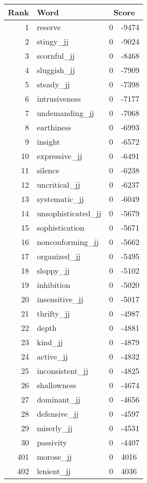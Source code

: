 \begin{longtable}[!htbp]{| rlr@{.}l |}
    \hline
    \textbf{Rank} & \textbf{Word} & \multicolumn{2}{c|}{\textbf{Score}} \\
    \hline
    \endhead
    1 & reserve & 0 & -9474 \\
    2 & stingy\_jj & 0 & -9024 \\
    3 & scornful\_jj & 0 & -8468 \\
    4 & sluggish\_jj & 0 & -7909 \\
    5 & steady\_jj & 0 & -7398 \\
    6 & intrusiveness & 0 & -7177 \\
    7 & undemanding\_jj & 0 & -7068 \\
    8 & earthiness & 0 & -6993 \\
    9 & insight & 0 & -6572 \\
    10 & expressive\_jj & 0 & -6491 \\
    11 & silence & 0 & -6238 \\
    12 & uncritical\_jj & 0 & -6237 \\
    13 & systematic\_jj & 0 & -6049 \\
    14 & unsophisticated\_jj & 0 & -5679 \\
    15 & sophistication & 0 & -5671 \\
    16 & nonconforming\_jj & 0 & -5662 \\
    17 & organized\_jj & 0 & -5495 \\
    18 & sloppy\_jj & 0 & -5102 \\
    19 & inhibition & 0 & -5020 \\
    20 & insensitive\_jj & 0 & -5017 \\
    21 & thrifty\_jj & 0 & -4987 \\
    22 & depth & 0 & -4881 \\
    23 & kind\_jj & 0 & -4879 \\
    24 & active\_jj & 0 & -4832 \\
    25 & inconsistent\_jj & 0 & -4825 \\
    26 & shallowness & 0 & -4674 \\
    27 & dominant\_jj & 0 & -4656 \\
    28 & defensive\_jj & 0 & -4597 \\
    29 & miserly\_jj & 0 & -4531 \\
    30 & passivity & 0 & -4407 \\
    401 & morose\_jj & 0 & 4016 \\
    402 & lenient\_jj & 0 & 4036 \\

\end{longtable}

